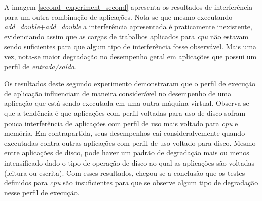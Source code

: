 A imagem \ref{second_experiment_second} apresenta os resultados de interferência para um outra combinação de aplicações. Nota-se que mesmo executando \textit{add\_double}+\textit{add\_double} a interferência apresentada é praticamente inexistente, evidenciando assim que as cargas de trabalhos aplicados para \textit{cpu} não estavam sendo suficientes para que algum tipo de interferência fosse observável. Mais uma vez, nota-se maior degradação no desempenho geral em aplicações que possui um perfil de \textit{entrada/saída}.

Os resultados deste segundo experimento demonstraram que o perfil de execução de aplicação influenciam de maneira considerável no desempenho de uma aplicação que está sendo executada em uma outra máquina virtual. Observa-se que a tendência é que aplicações com perfil voltadas para uso de disco sofram pouca interferência de aplicações com perfil de uso mais voltado para \textit{cpu} e memória. Em contrapartida, seus desempenhos cai consideralvemente quando executadas contra outras aplicações com perfil de uso voltado para disco. Mesmo entre aplicações de disco, pode haver um padrão de degradação mais ou menos intensificado dado o tipo de operação de disco ao qual as aplicações são voltadas (leitura ou escrita). Com esses resultados, chegou-se a conclusão que os testes definidos para \textit{cpu} são insuficientes para que se observe algum tipo de degradação nesse perfil de execução. 




  

